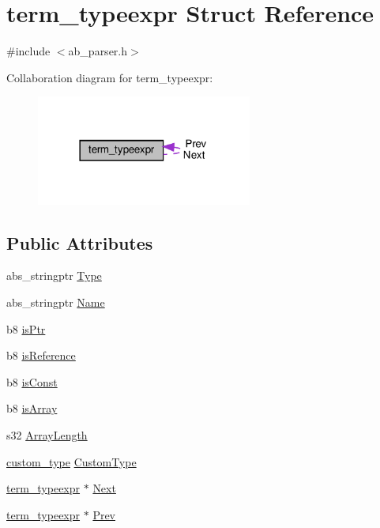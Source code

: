 \hypertarget{structterm__typeexpr}{}\section{term\+\_\+typeexpr Struct Reference}
\label{structterm__typeexpr}


{\ttfamily \#include $<$ab\+\_\+parser.\+h$>$}



Collaboration diagram for term\+\_\+typeexpr\+:
\nopagebreak
\begin{figure}[H]
\begin{center}
\leavevmode
\includegraphics[width=201pt]{db/de8/structterm__typeexpr__coll__graph}
\end{center}
\end{figure}
\subsection*{Public Attributes}
\begin{DoxyCompactItemize}
\item 
abs\+\_\+stringptr \hyperlink{structterm__typeexpr_ae05c0a936f42e129b697dc57ae803e0e}{Type}
\item 
abs\+\_\+stringptr \hyperlink{structterm__typeexpr_ace41bcc5404c7493366b27409acdf50c}{Name}
\item 
b8 \hyperlink{structterm__typeexpr_a93ac336807d6f45f5bd6270f21b02679}{is\+Ptr}
\item 
b8 \hyperlink{structterm__typeexpr_aa8779ec62ac26dd1239060953fd65f56}{is\+Reference}
\item 
b8 \hyperlink{structterm__typeexpr_af67982c68088bdca49bdcd1738bb7b7a}{is\+Const}
\item 
b8 \hyperlink{structterm__typeexpr_a2bc07d643069855d995bbcd4fa81006c}{is\+Array}
\item 
s32 \hyperlink{structterm__typeexpr_ab93773f58c02499d82f1dd1188182506}{Array\+Length}
\item 
\hyperlink{ab__parser_8h_ac9039717ce4cccacf493ee306650a423}{custom\+\_\+type} \hyperlink{structterm__typeexpr_a9544ece5f851486a3a725c0bd87df73f}{Custom\+Type}
\item 
\hyperlink{structterm__typeexpr}{term\+\_\+typeexpr} $\ast$ \hyperlink{structterm__typeexpr_a827f986754feb8a31cb88bb5929f35cb}{Next}
\item 
\hyperlink{structterm__typeexpr}{term\+\_\+typeexpr} $\ast$ \hyperlink{structterm__typeexpr_ac489d3375eb8507325fd21d328bdf2cc}{Prev}
\end{DoxyCompactItemize}


